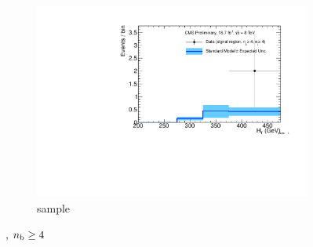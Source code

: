 \begin{figure}[h!]
\begin{subfigure}[b]{0.48\textwidth}
    \includegraphics[width=\textwidth,page=4]
    {Figs/results/v0/blueBand/bestFit_2012dev_RQcdZero_fZinvAll_ge4b_ge4j-1h_smOnly}
    \caption{\mj sample}
  \end{subfigure}
  \caption{\njhigh, $n_{\text{b}} \geq 4$}
  \label{fig:blue_fits_ge4b_ge4j}
\end{figure}
